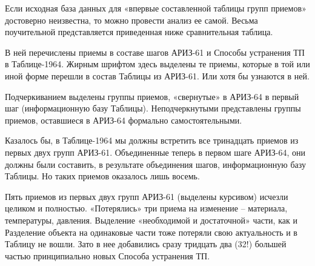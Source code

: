 \documentclass[11pt,a4paper]{article}
\begin{document}
Если исходная база данных для «впервые составленной таблицы групп приемов»
достоверно неизвестна, то можно провести анализ ее самой. Весьма поучительной
представляется приведенная ниже сравнительная таблица.

В ней перечислены приемы в составе шагов АРИЗ-61 и Способы устранения ТП в
Таблице-1964. Жирным шрифтом здесь выделены те приемы, которые в той или иной
форме перешли в состав Таблицы из АРИЗ-61. Или хотя бы узнаются в ней.

Подчеркиванием выделены группы приемов, «свернутые» в АРИЗ-64 в первый шаг
(информационную базу Таблицы). Неподчеркнутыми представлены группы приемов,
оставшиеся в АРИЗ-64 формально самостоятельными.

Казалось бы, в Таблице-1964 мы должны встретить все тринадцать приемов из
первых двух групп АРИЗ-61. Объединенные теперь в первом шаге АРИЗ-64, они
должны были составить, в результате объединения шагов, информационную базу
Таблицы. Но таких приемов оказалось лишь восемь.

Пять приемов из первых двух групп АРИЗ-61 (выделены курсивом) исчезли целиком
и полностью. «Потерялись» три приема на изменение -- материала, температуры,
давления. Выделение «необходимой и достаточной» части, как и Разделение
объекта на одинаковые части тоже потеряли свою актуальность и в Таблицу не
вошли.  Зато в нее добавились сразу тридцать два (32!) большей частью
принципиально новых Способа устранения ТП.
\end{document}
